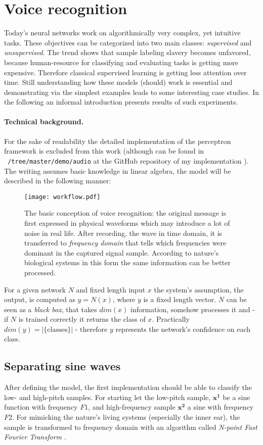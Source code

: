 \section{Voice recognition}

Today's neural networks work on algorithmically very complex, yet 
intuitive tasks. These objectives can be categorized into two main 
classes: \emph{supervised} and \emph{unsupervised}. 
The trend shows that sample labeling slavery becomes unfavored, 
because human-resource for classifying and evaluating tasks is getting more expensive.
Therefore classical supervised learning is getting less attention over time. 
Still understanding how these models (should) work is essential and 
demonstrating via the simplest examples leads to some interesting case 
studies. In the following an informal introduction presents results of 
such experiments.

\paragraph{Technical background.} 
For the sake of readability the detailed implementation of the perceptron 
framework is excluded from this work (although can be found in 
\texttt{~/tree/master/demo/audio} at the GitHub repository of my implementation \cite{DV}). 
The writing assumes basic knowledge in linear algebra, the model will be described in the following manner:
 
\begin{figure}
	\centering
	\texttt{[image: workflow.pdf]}
	\caption{
	The basic conception of voice recognition: 
	the original message is first expressed in physical waveforms which may introduce a lot of noise in real life. 
	After recording, the wave in time domain, it is transferred to \emph{frequency domain} that 
	tells which frequencies were dominant in the captured signal sample.
	According to nature's biological systems in this form the same information can be better processed.
	}
	\label{fig:workflow}
\end{figure}
For a given network $N$ and fixed length input $x$ the system's assumption, the output, is computed as $y=N(x)$, where $y$ is a fixed length vector.
$N$ can be seen as a \emph{black box}, that takes $dim(x)$ information, somehow processes it and - if $N$ is trained correctly it returns the class of $x$. Practically $dim(y)=|\{\textrm{classes}\}|$ - therefore $y$ represents the network's confidence on each class.

\subsection{Separating sine waves}
After defining the model, the first implementation should be able to classify the low- and high-pitch samples. For starting let the low-pitch sample, $\mathbf{x^1}$ be a sine function with frequency $F1$, and high-frequency sample $\mathbf{x^2}$ a sine with frequency $F2$. 
For mimicking the nature's living systems (especially the inner ear), the sample is transformed to frequency domain with an algorithm called \emph{N-point Fast Fourier Transform} \cite{welch1967use}. 

